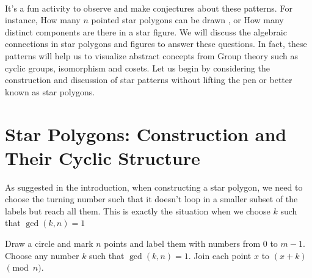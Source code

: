 \documentclass{article}
\begin{document}
\\[2mm]
It's a fun activity to observe and make conjectures about these patterns. For instance, How many $n$ pointed star polygons can be drawn , or How many distinct components are there in a star figure. We will discuss the algebraic connections in star polygons and figures to answer these questions. In fact, these patterns will help us to visualize abstract concepts from Group theory such as cyclic groups, isomorphism and cosets. Let us begin by considering the construction and discussion of star patterns without lifting the pen or better known as star polygons.
\section{Star Polygons: Construction and Their Cyclic Structure}

As suggested in the introduction, when constructing a star polygon, we need to choose the turning number such that it doesn't loop in a smaller subset of the labels but reach all them. This is exactly the situation when we choose $k$ such that $\gcd(k,n) =1$ 
\begin{framed}
	Draw a circle and mark $n$ points and label them with numbers from 0 to $m-1$. Choose any number $k$ such that $\gcd(k,n)=1$. Join each point $x$ to $(x+k)$ $\pmod{n}$.
\end{framed}
\end{document}
